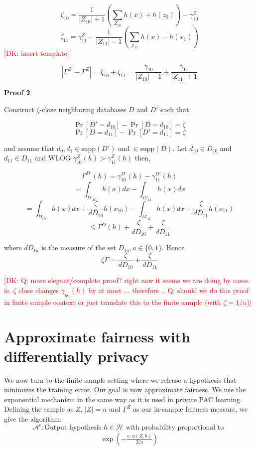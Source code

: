 \documentclass[format = sigconf]{acmart}
\newcommand{\dk}[1]{\textcolor{red}{[DK: #1]}}
\newcommand{\1}{\mathbbm{1}}
\newcommand{\eps}{\epsilon}
\newcommand{\zt}{\zeta}
\newcommand{\z}[1]{Z_{#1}}
\theoremstyle{definition}
\begin{document}
$$\zt_{10} = \frac{1}{|\z{10}|+1} (\sum_{\z{10}} h(x)+h(z_0)) - \gamma_{10}^{Z}$$
$$\zt_{11} = \gamma_{11}^{Z}- \frac{1}{|Z_{11}|-1} (\sum_{Z_{11}} h(x)-h(x_1))$$
\dk {insert template}

$$|\Gamma^{Z'}- \Gamma^{Z}| = \zt_{10} + \zt_{11}= \frac{\gamma_{10}}{|\z{10}|-1} + \frac{\gamma_{11}}{|Z_{11}|+1} $$

{\bf Proof 2}

Construct $\zt$-close neighboring databases $D$ and $D'$ such that

$$\Pr[D'=d_{10}] - \Pr[D=d_{10}] = \zt$$
$$\Pr[D=d_{11}] - \Pr[D'=d_{11}] = \zt$$



and assume that $d_0, d_1 \in \text{supp}(D')$ and $\in \text{supp}(D)$. Let $d_{10} \in D_{10}$ and $d_{11} \in D_{11}$ and WLOG $\gamma_{10}^Z(h) > \gamma_{11}^Z(h)$ then,

$$\Gamma^{D'}(h) = \gamma_{10}^{D'}(h) - \gamma_{11}^{D'}(h)$$
$$= \int_{D'_{10}}h(x)dx - \int_{D'_{11}}h(x)dx$$
$$= \int_{D_{10}}h(x)dx + \frac{\zt}{dD_{10}}h(x_{10}) - \int_{D'_{11}}h(x)dx - \frac{\zt}{dD_{11}}h(x_{11})$$
$$\leq \Gamma^{D}(h) + \frac{\zt}{dD_{10}} + \frac{\zt}{dD_{11}}$$

where $dD_{1a}$ is the measure of the set $D_{1a}, a \in \{0,1\}$. Hence
$$\zt\Gamma = \frac{\zt}{dD_{10}} + \frac{\zt}{dD_{11}}$$

\dk{Q: more elegant/complete proof? right now it seems we are doing by cases. ie. $\zt$ close changes $\gamma_{ya}(h)$ by at most ... therefore ..
Q: should we do this proof in finite sample context or just translate this to the finite sample (with $\zt = 1/n$)}

\section{Approximate fairness with differentially privacy}



We now turn to the finite sample setting where we release a hypothesis that minimizes the training error. Our goal is now approximate fairness. We use the exponential mechanism in the same way as it is used in private PAC learning. Defining the sample as $Z$, $|Z| = n$ and $\Gamma^{Z}$ as our in-sample fairness measure, we give the algorithm:
$$\mathcal{A}^\eps : \text{Output hypothesis }h \in \mathcal{H} \text{ with probability proportional to }$$
\begin{align}
\exp(-\frac{\eps \cdot u(Z,h)}{2\zt u})
\end{align}
\end{document}
